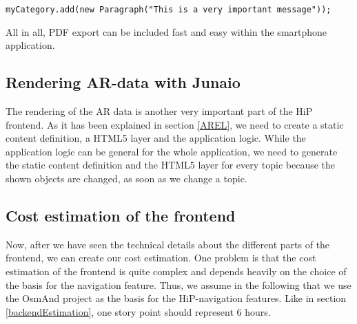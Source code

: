\verb|myCategory.add(new Paragraph("This is a very important message"));|  

All in all, \ac{PDF} export can be included fast and easy within the smartphone application.

\subsection{Rendering AR-data with Junaio}
The rendering of the \ac{AR} data is another very important part of the \ac{HiP} frontend. As it has been explained in section \ref{AREL}, we need to create a static content definition, a \ac{HTML5} layer and the application logic. While the application logic can be general for the whole application, we need to generate the static content definition and the \ac{HTML5} layer for every topic because the shown objects are changed, as soon as we change a topic.

\subsection{Cost estimation of the frontend}	
Now, after we have seen the technical details about the different parts of the frontend, we can create our cost estimation. One problem is that the cost estimation of the frontend is quite complex and depends heavily on the choice of the basis for the navigation feature. Thus, we assume in the following that we use the \ac{OsmAnd} project as the basis for the \ac{HiP}-navigation features. Like in section \ref{backendEstimation}, one story point should represent 6 hours.

